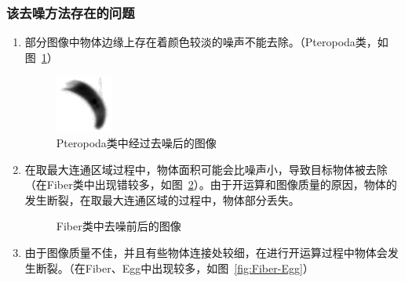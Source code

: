 \documentclass[12pt]{article}
\begin{document}
\subsubsection{该去噪方法存在的问题}
\begin{enumerate}
    \item 部分图像中物体边缘上存在着颜色较淡的噪声不能去除。（Pteropoda类，如图~\ref{fig:Pteropoda}）
    \begin{figure}[!ht]
        \centering
        \includegraphics[width=0.2\linewidth]{Pteropoda_jb19820512_1_510}
        \caption{Pteropoda类中经过去噪后的图像}
        \label{fig:Pteropoda}
    \end{figure}
    \item 在取最大连通区域过程中，物体面积可能会比噪声小，导致目标物体被去除（在Fiber类中出现错较多，如图~\ref{fig:Fiber}）。由于开运算和图像质量的原因，物体的发生断裂，在取最大连通区域的过程中，物体部分丢失。
    \begin{figure}[!ht]
        \centering
        \caption{Fiber类中去噪前后的图像}
        \label{fig:Fiber}
    \end{figure}
    \item 由于图像质量不佳，并且有些物体连接处较细，在进行开运算过程中物体会发生断裂。（在Fiber、Egg中出现较多，如图~\ref{fig:Fiber-Egg}）
        \begin{figure}[!ht]
        \centering
        \subfigure[Fiber类去噪后的图像]{
}
\end{figure}
\end{enumerate}
\end{document}
